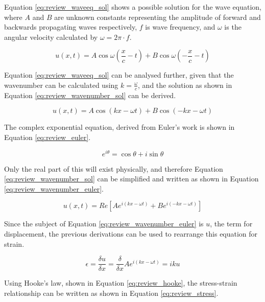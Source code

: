 Equation \ref{eq:review_waveeq_sol} shows a possible solution for the wave equation, where $A$ and $B$ are unknown constants representing the amplitude of forward and backwards propagating waves respectively, $f$ is wave frequency, and $\omega$ is the angular velocity calculated by $\omega = 2\pi \cdot f$.

\begin{equation} \label{eq:review_waveeq_sol}
u(x,t) = A \cos \omega (\frac{x}{c} -t) + B \cos \omega (-\frac{x}{c} - t)
 \end{equation}

Equation \ref{eq:review_waveeq_sol} can be analysed further, given that the wavenumber can be calculated using $k = \frac{\omega}{c}$, and the solution as shown in Equation \ref{eq:review_wavenumber_sol} can be derived.

\begin{equation} \label{eq:review_wavenumber_sol}
u(x,t) = A \cos(kx - \omega t) + B \cos(-kx - \omega t)
 \end{equation}

The complex exponential equation, derived from Euler's work is shown in Equation \ref{eq:review_euler}.

\begin{equation} \label{eq:review_euler}
e^{i\theta} = \cos\theta + i \sin\theta
 \end{equation}

Only the real part of this will exist physically, and therefore Equation \ref{eq:review_wavenumber_sol} can be simplified and written as shown in Equation \ref{eq:review_wavenumber_euler}.

\begin{equation} \label{eq:review_wavenumber_euler}
u(x,t) = Re[Ae^{i(kx-\omega t)} + Be^{i(-kx-\omega t)}]
 \end{equation}

Since the subject of Equation \ref{eq:review_wavenumber_euler} is $u$, the term for displacement, the previous derivations can be used to rearrange this equation for strain.

\begin{equation} \label{eq:review_wave_strain}
\epsilon = \frac{\delta u}{\delta x} = \frac{\delta}{\delta x} Ae^{i(kx-\omega t)} = iku
 \end{equation}

Using Hooke's law, shown in Equation \ref{eq:review_hooke}, the stress-strain relationship can be written as shown in Equation \ref{eq:review_stress}.

